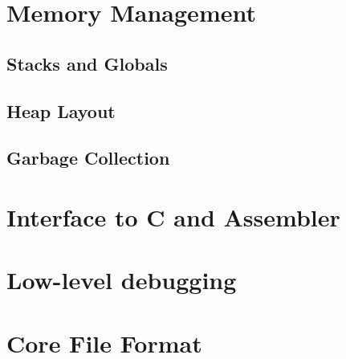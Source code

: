\chapter{Memory Management}
\section{Stacks and Globals}
\section{Heap Layout}
\section{Garbage Collection}

\chapter{Interface to C and Assembler}

\chapter{Low-level debugging}

\chapter{Core File Format}
